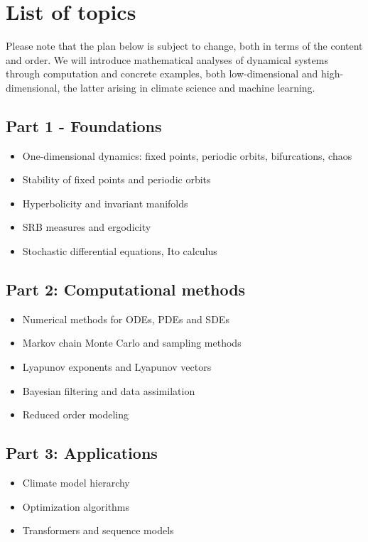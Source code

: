 \documentclass[12pt]{article}
\begin{document}
\section{List of topics}
\label{sec:topics}
Please note that the plan below is subject to change, both in terms of the content and order. We will introduce mathematical analyses of dynamical systems through computation and concrete examples, both low-dimensional and high-dimensional, the latter arising in climate science and machine learning. 
\subsection*{Part 1 - Foundations}

\begin{itemize}
	\item One-dimensional dynamics: fixed points, periodic orbits, bifurcations, chaos
	\item Stability of fixed points and periodic orbits
	\item Hyperbolicity and invariant manifolds
	\item SRB measures and ergodicity
	\item Stochastic differential equations, Ito calculus

\end{itemize}
\subsection*{Part 2: Computational methods}
\begin{itemize}
	\item Numerical methods for ODEs, PDEs and SDEs
	\item Markov chain Monte Carlo and sampling methods
	\item Lyapunov exponents and Lyapunov vectors
	\item Bayesian filtering and data assimilation
	\item Reduced order modeling
\end{itemize}

\subsection*{Part 3: Applications}
\begin{itemize}
	\item Climate model hierarchy
	\item Optimization algorithms
	\item Transformers and sequence models
\end{itemize}
\end{document}
